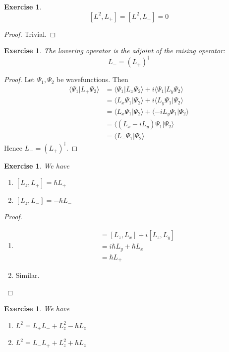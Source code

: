 \documentclass[12pt]{amsart}
\newtheorem{ex}[thm]{Exercise}
\renewcommand{\r}{\rangle}
\renewcommand{\l}{\langle}
\begin{document}
\begin{ex}
$$[L^2, L_+] = [L^2,L_-] = 0$$
\end{ex}

\begin{proof}
Trivial.
\end{proof}

\begin{ex}
The lowering operator is the adjoint of the raising operator: $$L_- = (L_+)^{\dagger}$$
\end{ex}

\begin{proof} Let $\Psi_1, \Psi_2$ be wavefunctions. Then 
\begin{align*}
\l \Psi_1 \vert L_+ \Psi_2 \r
&=  \l \Psi_1 \vert L_x \Psi_2 \r + i\l \Psi_1 \vert L_y \Psi_2 \r \\
&= \l L_x \Psi_1 \vert \Psi_2 \r + i\l L_y \Psi_1 \vert  \Psi_2 \r \\
&= \l L_x \Psi_1 \vert \Psi_2 \r + \l -i L_y \Psi_1 \vert  \Psi_2 \r \\
&= \l (L_x -iL_y)\Psi_1 \vert \Psi_2 \r\\
&= \l L_- \Psi_1 \vert \Psi_2 \r
\end{align*}
Hence $L_- = (L_+)^{\dagger}$.
\end{proof}

\begin{ex} We have 
\begin{enumerate}
\item $[L_z,L_+] = \hbar L_+$
\item $[L_z, L_-] = -\hbar L_-$
\end{enumerate}
\end{ex}

\begin{proof}\
\begin{enumerate}
\item 
\begin{align*}
[L_z,L_+] 
&= [L_z,L_x]+i[L_z,L_y]\\
&= i \hbar L_y + \hbar L_x\\
&= \hbar L_+
\end{align*}

\item Similar.
\end{enumerate}
\end{proof}

\begin{ex} We have
\begin{enumerate}
\item $L^2 = L_+L_- + L_z^2 - \hbar L_z$ 
\item $L^2 = L_-L_+ + L_z^2 + \hbar L_z$
\end{enumerate}
\end{ex}
\end{document}

